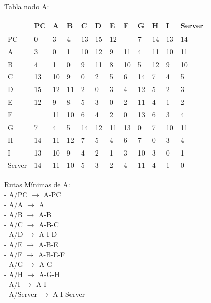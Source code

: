 \documentclass[a4paper]{article}
\begin{document}
\clearpage




\begin{table}[ht]
Tabla nodo A:\\
\begin{tabular}{|l|l|l|l|l|l|l|l|l|l|l|l|}
\hline
       & PC & A  & B & C & D & E & F & G & H & I  & Server \\ \hline
PC     & 0  & 3  & 4 & 13& 15& 12&   & 7 & 14& 13 & 14     \\ \hline
A      & 3  & 0  & 1 & 10& 12& 9 & 11& 4 & 11& 10 & 11     \\ \hline
B      & 4  & 1  & 0 & 9 & 11& 8 & 10& 5 & 12& 9  & 10     \\ \hline
C      & 13 & 10 & 9 & 0 & 2 & 5 & 6 & 14& 7 & 4  & 5      \\ \hline
D      & 15 & 12 & 11& 2 & 0 & 3 & 4 & 12& 5 & 2  & 3      \\ \hline
E      & 12 & 9  & 8 & 5 & 3 & 0 & 2 & 11& 4 & 1  & 2      \\ \hline
F      &    & 11 & 10& 6 & 4 & 2 & 0 & 13& 6 & 3  & 4      \\ \hline
G      & 7  & 4  & 5 & 14& 12& 11& 13& 0 & 7 & 10 & 11     \\ \hline
H      & 14 & 11 & 12& 7 & 5 & 4 & 6 & 7 & 0 & 3  & 4      \\ \hline
I      & 13 & 10 & 9 & 4 & 2 & 1 & 3 & 10& 3 & 0  & 1      \\ \hline
Server & 14 & 11 & 10& 5 & 3 & 2 & 4 & 11& 4 & 1  & 0      \\ \hline
\end{tabular}

Rutas Mínimas de A:\\
-	A/PC  $\rightarrow$  A-PC\\
-	A/A  $\rightarrow$  A\\
-	A/B  $\rightarrow$ A-B\\
-	A/C  $\rightarrow$  A-B-C\\
-	A/D  $\rightarrow$  A-I-D\\
-	A/E  $\rightarrow$  A-B-E\\
-	A/F  $\rightarrow$  A-B-E-F\\
-	A/G  $\rightarrow$  A-G\\
-	A/H  $\rightarrow$  A-G-H\\
-	A/I  $\rightarrow$  A-I\\
-	A/Server  $\rightarrow$  A-I-Server\\
\end{table}
\end{document}

